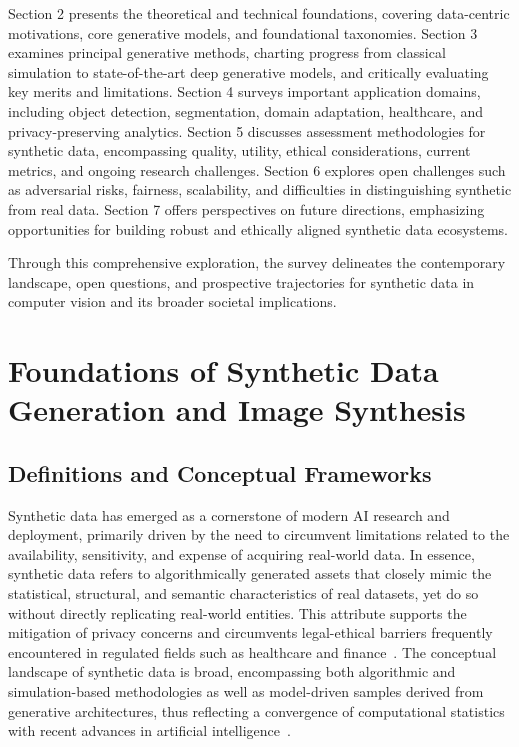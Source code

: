 \documentclass[sigconf]{acmart}
\begin{document}
Section 2 presents the theoretical and technical foundations, covering data-centric motivations, core generative models, and foundational taxonomies. Section 3 examines principal generative methods, charting progress from classical simulation to state-of-the-art deep generative models, and critically evaluating key merits and limitations. Section 4 surveys important application domains, including object detection, segmentation, domain adaptation, healthcare, and privacy-preserving analytics. Section 5 discusses assessment methodologies for synthetic data, encompassing quality, utility, ethical considerations, current metrics, and ongoing research challenges. Section 6 explores open challenges such as adversarial risks, fairness, scalability, and difficulties in distinguishing synthetic from real data. Section 7 offers perspectives on future directions, emphasizing opportunities for building robust and ethically aligned synthetic data ecosystems.

Through this comprehensive exploration, the survey delineates the contemporary landscape, open questions, and prospective trajectories for synthetic data in computer vision and its broader societal implications.

\section{Foundations of Synthetic Data Generation and Image Synthesis}

\subsection{Definitions and Conceptual Frameworks}

Synthetic data has emerged as a cornerstone of modern AI research and deployment, primarily driven by the need to circumvent limitations related to the availability, sensitivity, and expense of acquiring real-world data. In essence, synthetic data refers to algorithmically generated assets that closely mimic the statistical, structural, and semantic characteristics of real datasets, yet do so without directly replicating real-world entities. This attribute supports the mitigation of privacy concerns and circumvents legal-ethical barriers frequently encountered in regulated fields such as healthcare and finance~\cite{ref87}. The conceptual landscape of synthetic data is broad, encompassing both algorithmic and simulation-based methodologies as well as model-driven samples derived from generative architectures, thus reflecting a convergence of computational statistics with recent advances in artificial intelligence~\cite{ref1,ref13,ref64,ref87}.
\end{document}

